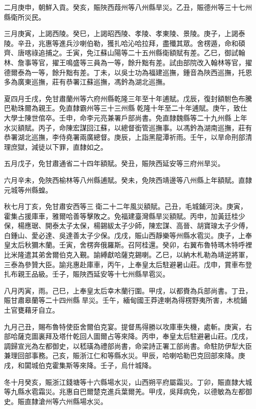 \begin{pinyinscope}
二月庚申，朝鮮入貢。癸亥，賑陜西葭州等八州縣旱災。乙丑，賑德州等三十七州縣衛所災民。

三月庚寅，上謁西陵。癸巳，上謁昭西陵、孝陵、孝東陵、景陵。庚子，上謁泰陵。辛丑，兆惠等進兵沙喇伯勒，獲扎哈沁哈拉拜，盡殲其眾。舍楞遁，命和碩齊、唐喀祿追捕之。壬寅，免江蘇山陽等二十五州縣衛額賦有差。乙巳，御試翰林、詹事等官，擢王鳴盛等三員為一等，餘升黜有差。試由部院改入翰林等官，擢德爾泰為一等，餘升黜有差。丁未，以吳士功為福建巡撫，鍾音為陜西巡撫，托恩多為廣東巡撫，莊有恭署江蘇巡撫，馮鈐為湖北巡撫。

夏四月壬戌，免甘肅蘭州等六府州縣乾隆三年至十年逋賦。戊辰，復封額駙色布騰巴勒珠爾為親王。免直隸霸州等三十三州縣乾隆十年至二十年逋賦。庚午，致仕大學士陳世倌卒。壬申，命李元亮兼署戶部尚書。免直隸魏縣等二十九州縣上年水災額賦。丙子，命陳宏謀回江蘇，以總督銜管巡撫事。以馮鈐為湖南巡撫，莊有恭署湖北巡撫，李侍堯署兩廣總督。庚辰，上詣黑龍潭祈雨。壬午，以旱命刑部清理庶獄，減徒以下罪，直隸如之。

五月戊子，免甘肅通省二十四年額賦。癸丑，賑陜西延安等三府州旱災。

六月辛未，免陜西榆林等八州縣逋賦。癸未，免陜西靖邊等八州縣上年額賦。直隸元城等州縣蝗。

秋七月丁亥，免甘肅安西等三衛二十二年風災額賦。己丑，毛城鋪河決。庚寅，霍集占援庫車，雅爾哈善等擊敗之。免福建臺灣縣旱災額賦。丙申，加黃廷桂少保，楊應琚、開泰太子太保，楊錫紱太子少師，陳宏謀、高晉、胡寶瑔太子少傅，白鍾山、愛必達、吳達善太子少保。戊戌，賑山西靜樂等州縣水雹災。庚子，上奉皇太后秋獮木蘭。壬寅，舍楞奔俄羅斯。召阿桂還。癸卯，右翼布魯特瑪木特呼裡比米隆遣其弟舍爾伯克入覲。諭縛獻哈薩克錫喇。乙巳，以納木札勒為靖逆將軍，三泰為參贊大臣。諭兆惠赴庫車，丙午，上奉皇太后駐避暑山莊。戊申，賞車布登扎布親王品級。壬子，賑陜西延安等十七州縣旱雹災。

八月丙寅，雨。己巳，上奉皇太后幸木蘭行圍。甲戌，以都賚為兵部尚書。丁丑，賑甘肅皋蘭等二十四州縣旱災。壬午，緬甸國王莽達喇為得楞野夷所害，木梳鋪土官甕藉牙自立。

九月己丑，賜布魯特使臣舍爾伯克宴。提督馬得勝以攻庫車失機，處斬。庚寅，右部哈薩克圖裏拜及塔什乾回人圖爾占等來降。丙申，奉皇太后駐避暑山莊。戊戌，調歸宣光為左都御史，以嵇璜為禮部尚書，命梁詩正署工部尚書。命駐防伊犁大臣兼理回部事務。己亥，賑浙江仁和等縣水災。甲辰，哈喇哈勒巴克回部來降。庚戌，和闐城伯克霍集斯等來降。壬子，烏什城降。

冬十月癸亥，賑浙江錢塘等十六縣場水災，山西朔平府屬霜災。丁卯，賑直隸大城等九縣水雹霜災。兆惠自巴爾楚克進兵葉爾羌。甲戌，吳拜病免，以德敏為左都御史。賑直隸滄州等六州縣場水災。


\end{pinyinscope}
